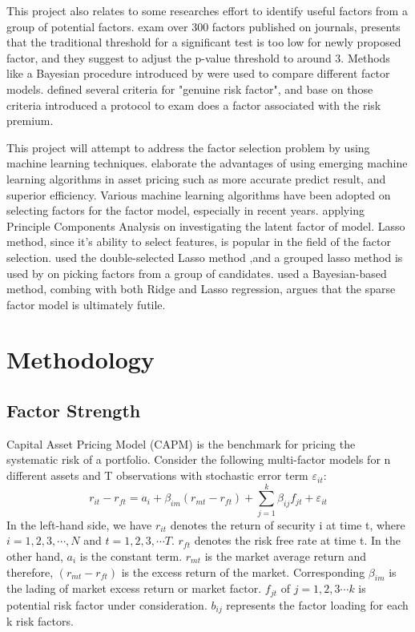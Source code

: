 \documentclass[12pt]{article}
\begin{document}
	
This project also relates to some researches effort to identify useful factors from a group of potential factors.
 exam over 300 factors published on journals, presents that the traditional threshold for a significant test is too low for newly proposed factor, and they suggest to adjust the p-value threshold to around 3. 
Methods like a Bayesian procedure introduced by  were used to compare different factor models.
 defined several criteria for "genuine risk factor", and base on those criteria introduced a protocol to exam does a factor associated with the risk premium.


This project will attempt to address the factor selection problem by using machine learning techniques.
 elaborate the advantages of using emerging machine learning algorithms in asset pricing such as more accurate predict result, and superior efficiency.
Various machine learning algorithms have been adopted on selecting factors for the factor model, especially in recent years.
 applying Principle Components Analysis on investigating the latent factor of model. 
Lasso method, since it's ability to select features, is popular in the field of the factor selection.
 used the double-selected Lasso method \cite{Belloni2014},and a grouped lasso method \cite{Huang2010} is used by  on picking factors from a group of candidates. 
 used a Bayesian-based method, combing with both Ridge and Lasso regression, argues that the sparse factor model is ultimately futile. 


	\section{Methodology}
			\subsection{Factor Strength}\label{strength}
Capital Asset Pricing Model (CAPM) is the benchmark for pricing the systematic risk of a portfolio. 
Consider the following multi-factor models for n different assets and T observations with stochastic error term $\varepsilon_{it}$:
\[   r_{it} - r_{ft} = a_i + \beta_{im}(r_{mt} - r_{ft}) + \sum_{j=1}^{k}\beta_{ij}f_{jt} + \varepsilon_{it} \tag{1}\label{2CAPM} \]
In the left-hand side, we have $r_{it}$ denotes the return of  security i at time t, where $i = 1, 2,3, \cdots, N$ and $t = 1,2,3, \cdots T$.  
$r_{ft}$ denotes the risk free rate at time t.
In the other hand, $a_i$ is the constant term. 
$r_{mt}$ is the market average return and therefore, $(r_{mt} - r_{ft}) $ is the excess return of the market. 
Corresponding $\beta_{im}$ is the lading of market excess return or market factor.
$f_{jt}$ of $j = 1, 2, 3\cdots k$ is potential risk factor under consideration.
$b_{ij}$ represents the factor loading for each k risk factors.
\end{document}
